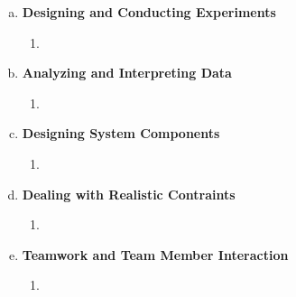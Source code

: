 \documentclass[11pt]{article}   %
\begin{document}
\begin{enumerate} [a)]
\item  {\bf Designing and Conducting Experiments}
\begin{enumerate} [$\cdot$]
\item 
\end{enumerate}
\item  {\bf Analyzing and Interpreting Data}
\begin{enumerate} [$\cdot$]
\item  
\end{enumerate}
\item {\bf Designing System Components}
\begin{enumerate} [$\cdot$]
\item 
\end{enumerate}
\item {\bf Dealing with Realistic Contraints}
\begin{enumerate} [$\cdot$]
\item 
\end{enumerate}
\item  {\bf Teamwork and Team Member Interaction}
\begin{enumerate} [$\cdot$]
\item 
\end{enumerate}
\end{enumerate}









\end{document}
